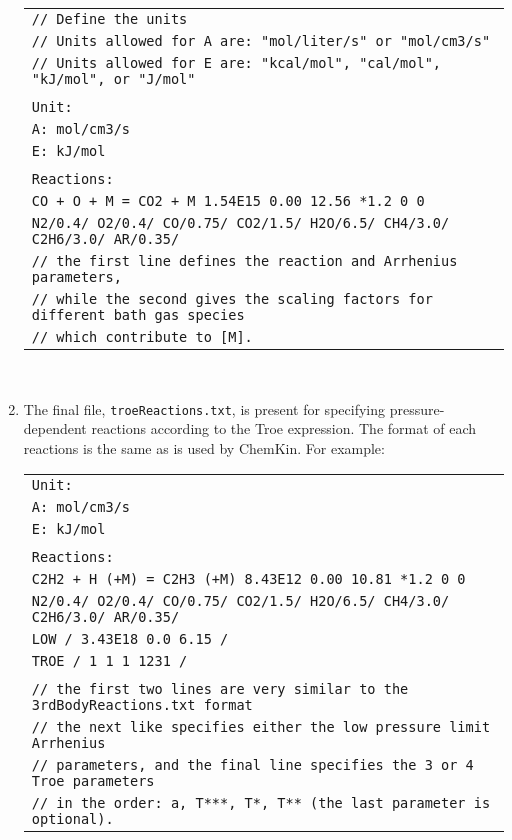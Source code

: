 \documentclass[12pt,letterpaper]{article}
\begin{document}
\begin{enumerate}
{\footnotesize{
\begin{tabular}{l}
\texttt{// Define the units} \\
\texttt{// Units allowed for A are: "mol/liter/s" or "mol/cm3/s"} \\
\texttt{// Units allowed for E are: "kcal/mol", "cal/mol", "kJ/mol", or "J/mol"} \\
\\
\texttt{Unit:} \\
\texttt{A: mol/cm3/s} \\
\texttt{E: kJ/mol} \\
\\
\texttt{Reactions:} \\
\texttt{CO + O + M = CO2 + M 1.54E15 0.00 12.56 *1.2 0 0} \\
\texttt{N2/0.4/ O2/0.4/ CO/0.75/ CO2/1.5/ H2O/6.5/ CH4/3.0/ C2H6/3.0/ AR/0.35/} \\
\texttt{// the first line defines the reaction and Arrhenius parameters,} \\
\texttt{// while the second gives the scaling factors for different bath gas species} \\
\texttt{// which contribute to [M].} \\
\end{tabular}\\
}}

\item The final file, \texttt{troeReactions.txt}, is present for specifying pressure-dependent
reactions according to the Troe expression. The format of each reactions
is the same as is used by ChemKin. For example:

{\footnotesize{
\begin{tabular}{l}
\texttt{Unit:} \\
\texttt{A: mol/cm3/s} \\
\texttt{E: kJ/mol} \\
\\
\texttt{Reactions:} \\
\texttt{C2H2 + H (+M) = C2H3 (+M) 8.43E12 0.00 10.81 *1.2 0 0} \\
\texttt{N2/0.4/ O2/0.4/ CO/0.75/ CO2/1.5/ H2O/6.5/ CH4/3.0/ C2H6/3.0/ AR/0.35/} \\
\texttt{LOW / 3.43E18 0.0 6.15 /} \\
\texttt{TROE / 1 1 1 1231 /} \\
\\
\texttt{// the first two lines are very similar to the 3rdBodyReactions.txt format} \\
\texttt{// the next like specifies either the low pressure limit Arrhenius} \\
\texttt{// parameters, and the final line specifies the 3 or 4 Troe parameters} \\
\texttt{// in the order: a, T***, T*, T** (the last parameter is optional).} \\
\end{tabular}\\
}}









\end{enumerate}
\end{document}
